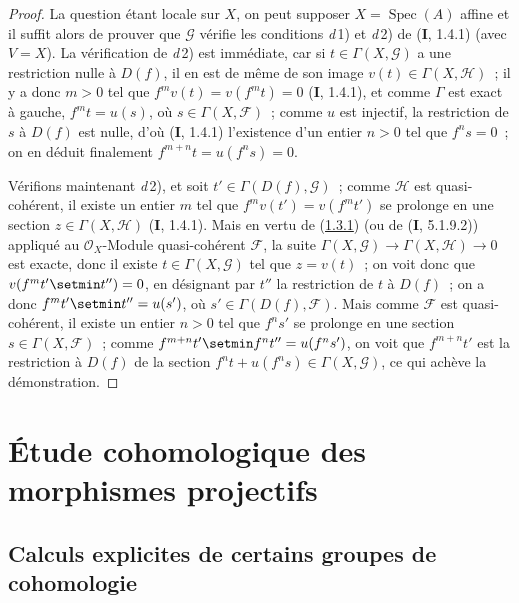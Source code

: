 \begin{proof}
La question étant locale sur $X$, on peut supposer
$X=\operatorname{Spec}(A)$ affine et il suffit alors de prouver que
$\mathcal G$ vérifie les conditions \textit{d}\,1) et \textit{d}\,2) de (\textbf{I}, 1.4.1) (avec
$V=X$). La vérification de \textit{d}\,2) est immédiate, car si
$t\in\Gamma(X,\mathcal G)$ a une restriction nulle à $D(f)$, il en est de
même de son image $v(t)\in\Gamma(X,\mathcal H)$~; il y a donc $m>0$ tel que
$f^mv(t)=v(f^mt)=0$ (\textbf{I}, 1.4.1), et comme $\Gamma$ est exact à gauche,
$f^mt=u(s)$, où $s\in\Gamma(X,\mathcal F)$~; comme $u$ est injectif, la
restriction de $s$ à $D(f)$ est nulle, d'où (\textbf{I}, 1.4.1) l'existence d'un
entier $n>0$ tel que $f^ns=0$~; on en déduit finalement
$f^{m+n}t=u(f^ns)=0$.

Vérifions maintenant \textit{d}\,2), et soit $t'\in\Gamma(D(f),\mathcal G)$~; comme
$\mathcal H$ est quasi-cohérent, il existe un entier $m$ tel que
$f^mv(t')=v(f^mt')$ se prolonge en une section
$z\in\Gamma(X,\mathcal H)$ (\textbf{I}, 1.4.1). Mais en vertu de
(\hyperref[III.1.3.1-fr]{1.3.1}) (ou de (\textbf{I}, 5.1.9.2)) appliqué au
$\mathcal O_X$-Module quasi-cohérent $\mathcal F$, la suite
$\Gamma(X,\mathcal G)\to\Gamma(X,\mathcal H)\to0$ est exacte, donc il existe
$t\in\Gamma(X,\mathcal G)$ tel que $z=v(t)$~; on voit donc que
$v(f^mt'\setmin t'')=0$, en désignant par $t''$ la restriction de $t$ à $D(f)$~;
on a donc $f^mt'\setmin t''=u(s')$, où $s'\in\Gamma(D(f),\mathcal F)$. Mais comme
$\mathcal F$ est quasi-cohérent, il existe un entier $n>0$ tel que $f^ns'$
se prolonge en une section $s\in\Gamma(X,\mathcal F)$~; comme
$f^{m+n}t'\setmin f^nt''=u(f^ns')$, on voit que $f^{m+n}t'$ est la restriction à
$D(f)$ de la section $f^nt+u(f^ns)\in\Gamma(X,\mathcal G)$, ce qui achève
la démonstration.
\end{proof}

\section{Étude cohomologique des morphismes projectifs}
\label{section:III.2-fr}

\subsection{Calculs explicites de certains groupes de cohomologie}
\label{subsection:III.2.1-fr}

